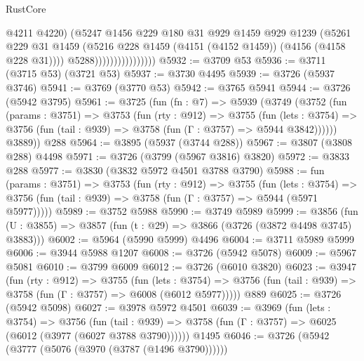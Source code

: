 \begin{lexlean}{RustCore}
\begin{coremodule}
                                    @4211
                                    @4220)
                                  (@5247
                                    @1456
                                    @229
                                    @180
                                    @31
                                    @929
                                    @1459
                                    @929
                                    @1239
                                    (@5261
                                      @229
                                      @31
                                      @1459
                                      (@5216
                                        @228
                                        @1459
                                        (@4151 (@4152 @1459))
                                        (@4156 (@4158 @228 @31))))
                                    @5288))))))))))))))))
@5932 := @3709 @53
@5936 := @3711 (@3715 @53) (@3721 @53)
@5937 := @3730 @4495
@5939 := @3726 (@5937 @3746)
@5941 := @3769 (@3770 @53)
@5942 := @3765 @5941
@5944 := @3726 (@5942 @3795)
@5961 := @3725
    (fun (fn : @7) =>
    @5939
      (@3749
        (@3752
          (fun (params : @3751) =>
          @3753
            (fun (rty : @912) =>
            @3755
              (fun (lets : @3754) =>
              @3756 (fun (tail : @939) => @3758 (fun (Γ : @3757) => @5944 @3842))))))
        @3889))
    @288
@5964 := @3895 (@5937 (@3744 @288))
@5967 := @3807 (@3808 @288) @4498
@5971 := @3726 (@3799 (@5967 @3816) @3820)
@5972 := @3833 @288
@5977 := @3830 (@3832 @5972 @4501 @3788 @3790)
@5988 := fun (params : @3751) =>
  @3753
    (fun (rty : @912) =>
    @3755
      (fun (lets : @3754) =>
      @3756 (fun (tail : @939) => @3758 (fun (Γ : @3757) => @5944 (@5971 @5977)))))
@5989 := @3752 @5988
@5990 := @3749 @5989
@5999 := @3856 (fun (U : @3855) => @3857 (fun (t : @29) => @3866 (@3726 (@3872 @4498 @3745) @3883)))
@6002 := @5964 (@5990 @5999) @4496
@6004 := @3711 @5989 @5999
@6006 := @3944 @5988 @1207
@6008 := @3726 (@5942 @5078)
@6009 := @5967 @5081
@6010 := @3799 @6009
@6012 := @3726 (@6010 @3820)
@6023 := @3947
    (fun (rty : @912) =>
    @3755
      (fun (lets : @3754) =>
      @3756 (fun (tail : @939) => @3758 (fun (Γ : @3757) => @6008 (@6012 @5977)))))
    @889
@6025 := @3726 (@5942 @5098)
@6027 := @3978 @5972 @4501
@6039 := @3969
    (fun (lets : @3754) =>
    @3756
      (fun (tail : @939) => @3758 (fun (Γ : @3757) => @6025 (@6012 (@3977 (@6027 @3788 @3790))))))
    @1495
@6046 := @3726 (@5942 (@3777 (@5076 (@3970 (@3787 (@1496 @3790))))))

\end{coremodule}
\end{lexlean}

